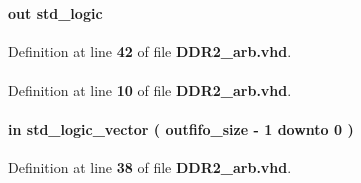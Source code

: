 \paragraph[{local\+\_\+write\+\_\+req}]{ {\bfseries \textcolor{keywordflow}{out}\textcolor{vhdlchar}{ }} {\bfseries \textcolor{comment}{std\+\_\+logic}\textcolor{vhdlchar}{ }} \hspace{0.3cm}{\ttfamily [Port]}}\label{classDDR2__arb_a9848360829351466c39f4556bbb190b6}


Definition at line {\bf 42} of file {\bf D\+D\+R2\+\_\+arb.\+vhd}.

\paragraph[{numeric\+\_\+std}]{\hspace{0.3cm}{\ttfamily [Package]}}\label{classDDR2__arb_a2edc34402b573437d5f25fa90ba4013e}


Definition at line {\bf 10} of file {\bf D\+D\+R2\+\_\+arb.\+vhd}.

\paragraph[{outbuf\+\_\+wrusedw}]{ {\bfseries \textcolor{keywordflow}{in}\textcolor{vhdlchar}{ }} {\bfseries \textcolor{comment}{std\+\_\+logic\+\_\+vector}\textcolor{vhdlchar}{ }\textcolor{vhdlchar}{(}\textcolor{vhdlchar}{ }\textcolor{vhdlchar}{ }\textcolor{vhdlchar}{ }\textcolor{vhdlchar}{ }{\bfseries {\bf outfifo\+\_\+size}} \textcolor{vhdlchar}{-\/}\textcolor{vhdlchar}{ } \textcolor{vhdldigit}{1} \textcolor{vhdlchar}{ }\textcolor{keywordflow}{downto}\textcolor{vhdlchar}{ }\textcolor{vhdlchar}{ } \textcolor{vhdldigit}{0} \textcolor{vhdlchar}{ }\textcolor{vhdlchar}{)}\textcolor{vhdlchar}{ }} \hspace{0.3cm}{\ttfamily [Port]}}\label{classDDR2__arb_a3a105e549d5336471780ad090329925d}


Definition at line {\bf 38} of file {\bf D\+D\+R2\+\_\+arb.\+vhd}.

